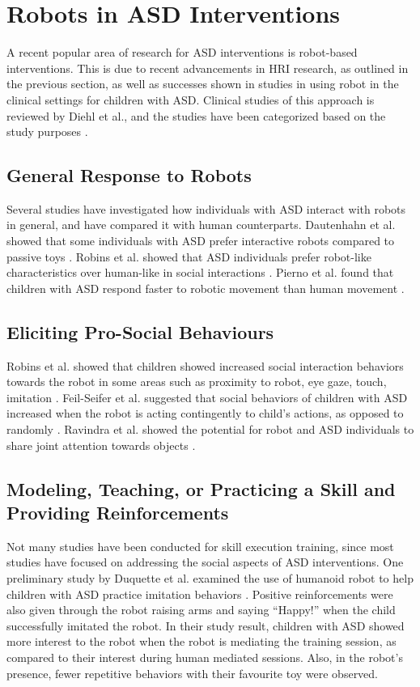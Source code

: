 \documentclass{ut-thesis}
\begin{document}
\section{Robots in ASD Interventions}


A recent popular area of research for ASD interventions is robot-based interventions.  This is due to recent advancements in HRI research, as outlined in the previous section, as well as successes shown in studies in using robot in the clinical settings for children with ASD.  Clinical studies of this approach is reviewed by Diehl et al., and the studies have been categorized based on the study purposes \cite{diehl2012clinical}.


\subsection{General Response to Robots}
Several studies have investigated how individuals with ASD interact with robots in general, and have compared it with human counterparts.  Dautenhahn et al. showed that some individuals with ASD prefer interactive robots compared to passive toys \cite{dautenhahn2004towards}.  Robins et al. showed that ASD individuals prefer robot-like characteristics over human-like in social interactions \cite{robins2006does}.  Pierno et al. found that children with ASD respond faster to robotic movement than human movement \cite{pierno2008robotic}.


\subsection{Eliciting Pro-Social Behaviours}
Robins et al. showed that children showed increased social interaction behaviors towards the robot in some areas such as proximity to robot, eye gaze, touch, imitation \cite{robins2005robotic}.  Feil-Seifer et al. suggested that social behaviors of children with ASD increased when the robot is acting contingently to child's actions, as opposed to randomly \cite{feil2009toward}.  Ravindra et al. showed the potential for robot and ASD individuals to share joint attention towards objects \cite{ravindra2009therapeutic}.


\subsection{Modeling, Teaching, or Practicing a Skill and Providing Reinforcements}
Not many studies have been conducted for skill execution training, since most studies have focused on addressing the social aspects of ASD interventions.  One preliminary study by Duquette et al. examined the use of humanoid robot to help children with ASD practice imitation behaviors \cite{duquette2008exploring}.  Positive reinforcements were also given through the robot raising arms and saying ``Happy!'' when the child successfully imitated the robot.  In their study result, children with ASD showed more interest to the robot when the robot is mediating the training session, as compared to their interest during human mediated sessions.  Also, in the robot's presence, fewer repetitive behaviors with their favourite toy were observed.
\end{document}
